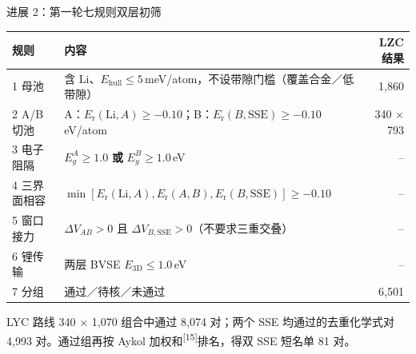 \documentclass[aspectratio=169,10pt]{beamer}
\renewcommand{\cite}[1]{\textsuperscript{\color{NJUMuted}[#1]}}
\newenvironment{decktable}
  {\par\fontsize{8.3}{10.8}\selectfont\renewcommand{\arraystretch}{1.22}}
  {\par}
\begin{document}
\begin{frame}[t]{进展 2：第一轮七规则双层初筛}
\begin{decktable}
\begin{tabular}{@{}lL{.50\textwidth}r@{}}
  \toprule
  规则 & 内容 & LZC 结果 \\
   母池 & 含 Li、$E_\mathrm{hull}\le 5$\,meV/atom，不设带隙门槛（覆盖合金／低带隙） & 1{,}860 \\
  2 A/B 切池 & A：$E_\mathrm{r}(\mathrm{Li},A)\ge-0.10$；B：$E_\mathrm{r}(B,\mathrm{SSE})\ge-0.10$\,eV/atom & 340 × 793 \\
  3 电子阻隔 & $E_g^A\ge1.0$ \textbf{或} $E_g^B\ge1.0$\,eV & -- \\
  4 三界面相容 & $\min[E_\mathrm{r}(\mathrm{Li},A),E_\mathrm{r}(A,B),E_\mathrm{r}(B,\mathrm{SSE})]\ge-0.10$ & -- \\
  5 窗口接力 & $\Delta V_{AB}>0$ 且 $\Delta V_{B,\mathrm{SSE}}>0$（不要求三重交叠） & -- \\
  6 锂传输 & 两层 BVSE $E_\mathrm{3D}\le1.0$\,eV & -- \\
  7 分组 & 通过／待核／未通过 & \alert{6{,}501} \\
  \bottomrule
\end{tabular}
\end{decktable}

LYC 路线 340 × 1{,}070 组合中通过 \alert{8{,}074} 对；两个 SSE 均通过的去重化学式对 4{,}993 对。通过组再按 Aykol 加权和\cite{15}排名，得双 SSE 短名单 81 对。
\end{frame}
\end{document}
